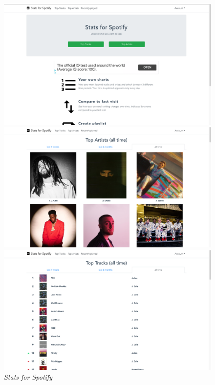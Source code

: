 \documentclass{report}
\begin{document}
%
\begin{figure}
    \centering
    \begin{minipage}[b]{0.7\textwidth}
    \includegraphics[width=\textwidth]{Imagens/statsforspotify.png}
    \end{minipage}
    \hfill
    \begin{minipage}[b]{0.7\textwidth}
    \includegraphics[width=\textwidth]{Imagens/topartists.png}
    \end{minipage}
     \hfill
    \begin{minipage}[b]{0.7\textwidth}
    \includegraphics[width=\textwidth]{Imagens/toptracks.png}
    \end{minipage}
    \caption{\textit{Stats for Spotify}} \label{fig7:stats}
\end{figure}
\end{document}
